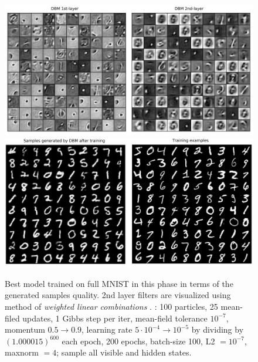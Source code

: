 \begin{figure}[h]
\begin{mdframed}
\centering
\includegraphics[width=5.6in]{dbm-mnist/filters.png}
\\[2em]
\includegraphics[width=5.6in]{dbm-mnist/samples.png}
\caption{Best model trained on full MNIST in this phase in terms of the generated samples quality. 2nd layer filters are visualized using method of \emph{weighted linear combinations} \cite{erhan2009visualizing}. : 100 particles, 25 mean-filed updates, 1 Gibbs step per iter, mean-field tolerance $10^{-7}$, momentum $0.5\rightarrow 0.9$, learning rate $5\cdot10^{-4}\rightarrow 10^{-5}$ by dividing by $(1.000015)^{600}$ each epoch, 200 epochs, batch-size 100, L2 $=10^{-7}$, maxnorm $=4$; sample all visible and hidden states.
}
\end{mdframed}
\end{figure}

\clearpage

